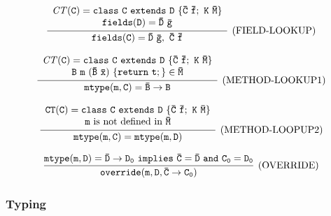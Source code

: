 \documentclass[letterpaper]{article}
\begin{document}
\[
  \begin{array}{c}
    \infer[\text{(FIELD-LOOKUP)}]
    {\tt fields(C)=\bar{D}\ \bar{g},~ \bar{C}\ \bar{f}}
    {\begin{array}{c}
      \tt \mathit{CT}(C)=class\ C\ extends\ D\ \{\bar{C}\ \bar{f};\ K\ \bar{M}\} \\
      \tt fields(D)=\bar{D}\ \bar{g}
      \end{array}
    }
  \end{array}
\]

\[
  \begin{array}{c}
    \infer[\text{(METHOD-LOOKUP1)}]
    {\tt mtype(m,C)=\bar{B}\rightarrow B}
    {
      \begin{array}{c}
        \tt \mathit{CT}(C)=class\ C\ extends\ D\ \{\bar{C}\ \bar{f};\ K\ \bar{M}\}\\
        \tt B\ m\ (\bar{B}\ \bar{x})\ \{return\ t;\} \in \bar{M}
      \end{array}
    }
  \end{array}
\]

\[
  \begin{array}{c}
    \infer[\text{(METHOD-LOOPUP2)}]
    {\tt mtype(m,C)=mtype(m,D)}
    {
      \begin{array}{c}
        \tt CT(C)=class\ C\ extends\ D\ \{\bar{C}\ \bar{f};\ K\ \bar{M}\}\\
        \text{$\tt m$ is not defined in $\tt\bar{M}$}
      \end{array}
    }
  \end{array}
\]

\[
  \begin{array}{c}
    \infer[\text{(OVERRIDE)}]
    {\tt override(m,D,\bar{C}\rightarrow C_0)}
    {\tt mtype(m,D)=\bar{D}\rightarrow D_0\ implies\ \bar{C}=\bar{D}\ and\ C_0=D_0}
  \end{array}
\]
\subsubsection{Typing}
\begin{center}
\DP
\end{center}
\vspace{3pt}

\begin{center}
\DP
\end{center}
\vspace{3pt}
\end{document}

